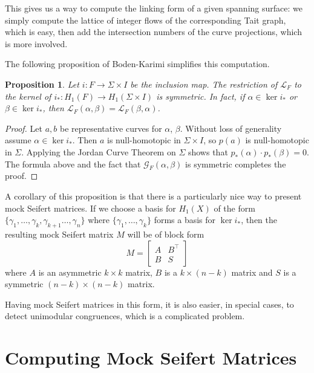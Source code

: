 \documentclass[12pt]{report}
\newtheorem*{proposition}{Proposition}
\theoremstyle{upright}
\begin{document}
This gives us a way to compute the linking form of a given spanning surface: we simply compute the lattice of integer flows of the corresponding Tait graph, which is easy, then add the intersection numbers of the curve projections, which is more involved.

The following proposition of Boden-Karimi \cite[Remark 3.2]{mock-seifert-matrices} simplifies this computation.

\begin{proposition}
	Let $i: F \longrightarrow \Sigma \times I$ be the inclusion map. The restriction of $\mathcal{L}_{F}$ to the kernel of ${i_{*}: H_{1}(F) \longrightarrow H_{1}(\Sigma \times I)}$ is symmetric. In fact, if $\alpha \in \ker i_{*}$ or $\beta \in \ker i_{*}$, then ${\mathcal{L}_{F}(\alpha, \beta) = \mathcal{L}_{F}(\beta, \alpha)}$.
\end{proposition}

\begin{proof}
	Let $a, b$ be representative curves for $\alpha$, $\beta$. Without loss of generality assume $\alpha \in \ker i_{*}$. Then $a$ is null-homotopic in $\Sigma \times I$, so $p(a)$ is null-homotopic in $\Sigma$. Applying the Jordan Curve Theorem on $\Sigma$  shows that $p_{*}(\alpha) \cdot p_{*}(\beta) = 0$. The formula above and the fact that $\mathcal{G}_{F}(\alpha, \beta)$ is symmetric completes the proof.
\end{proof}

A corollary of this proposition is that there is a particularly nice way to present mock Seifert matrices. If we choose a basis for $H_{1}(X)$ of the form $\{\gamma_{1}, \dots, \gamma_{k}, \gamma_{k + 1} \dots, \gamma_{n}\}$ where $\{\gamma_{1}, \dots, \gamma_{k}\}$ forms a basis for $\ker i_{*}$, then the resulting mock Seifert matrix $M$ will be of block form
\[M = \begin{bmatrix}
	A & B^{\top} \\
	B & S
\end{bmatrix}\]
where $A$ is an asymmetric $k \times k$ matrix, $B$ is a $k \times (n - k)$ matrix and $S$ is a symmetric $(n - k) \times (n - k)$ matrix.

Having mock Seifert matrices in this form, it is also easier, in special cases, to detect unimodular congruences, which is a complicated problem.

\section{Computing Mock Seifert Matrices}
\end{document}
